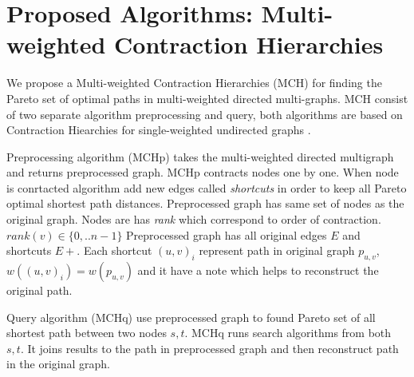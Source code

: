 
\section{Proposed Algorithms: Multi-weighted Contraction Hierarchies}

We propose a Multi-weighted Contraction Hierarchies (MCH) for finding the Pareto set
of optimal paths in multi-weighted directed multi-graphs. 
MCH consist of two separate algorithm preprocessing and query,
both algorithms are based on Contraction Hiearchies 
for single-weighted undirected graphs \cite{geisberger2008contraction}.


Preprocessing algorithm (MCHp) takes the multi-weighted directed multigraph
and returns preprocessed graph. MCHp contracts nodes one by one. 
When node is conrtacted algorithm add new edges called \emph{shortcuts} in order
to keep all Pareto optimal shortest path distances. 
Preprocessed graph has same set of nodes as the original graph.
Nodes are has \emph{rank} which correspond to order of contraction.
$rank(v) \in \{0,..n-1\}$
Preprocessed graph has all original edges $E$ and shortcuts $E+$.
Each shortcut $(u,v)_i$ represent 
path in original graph $p_{u,v}$, $w((u,v)_i) = w(p_{u,v})$ and it have a note which helps
to reconstruct the original path.

Query algorithm (MCHq) use preprocessed graph to found Pareto set of all
shortest path between two nodes $s, t$. MCHq runs search algorithms
from both $s, t$. 
It joins results to the path in preprocessed graph 
and then reconstruct path in the original graph.




